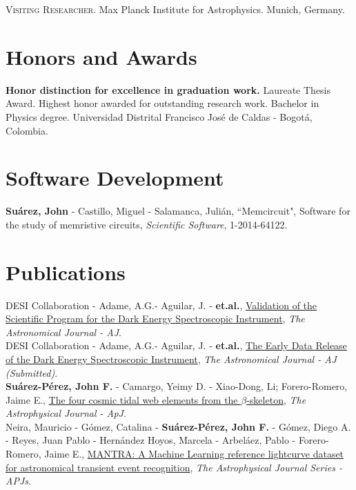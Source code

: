 \documentclass[10pt, a4paper]{article}
\newcommand{\years}[1]{\marginnote{\scriptsize #1}}
\begin{document}
\years{2019.06}\textsc{Visiting Researcher}. Max Planck Institute for Astrophysics. Munich, Germany.

\section*{Honors and Awards}
\years{2014}\textbf{Honor distinction for excellence in graduation work.} Laureate Thesis Award. 
Highest honor awarded for outstanding research work. Bachelor in Physics degree. Universidad Distrital Francisco José de Caldas - Bogotá, Colombia.

\section*{Software Development}
\noindent
\years{2014}\textbf{Suárez, John} - Castillo, Miguel - Salamanca, Julián, “Memcircuit", Software for 
the study of memristive circuits, \emph{Scientific Software}, 1-2014-64122.



\section*{Publications}

\noindent
\years{2024}DESI Collaboration - Adame, A.G.- Aguilar, J. - \textbf{et.al.}, \href{https://iopscience.iop.org/article/10.3847/1538-3881/ad0b08/pdf}{Validation of the 
Scientific Program for the Dark Energy Spectroscopic Instrument}, \emph{The Astronomical Journal - AJ}.
\\

\years{2023}DESI Collaboration - Adame, A.G.- Aguilar, J. - \textbf{et.al.}, \href{https://arxiv.org/abs/2306.06308}{The Early Data Release of the Dark Energy Spectroscopic Instrument}, \emph{The Astronomical Journal - AJ (Submitted)}.
\\

\years{2021}\textbf{Suárez-Pérez, John F.} - Camargo, Yeimy D. - Xiao-Dong, Li; Forero-Romero, 
Jaime E., \href{https://iopscience.iop.org/article/10.3847/1538-4357/ac1fed/pdf}{The four cosmic tidal web elements from the $\beta$-skeleton}, \emph{The Astrophysical Journal - ApJ}. 
\\

\years{2020}Neira, Mauricio - Gómez, Catalina - \textbf{Suárez-Pérez, John F.} - Gómez, Diego A. - Reyes, Juan Pablo - Hernández Hoyos, Marcela - Arbeláez, Pablo - Forero-Romero, Jaime E., \href{https://iopscience.iop.org/article/10.3847/1538-4365/aba267/pdf}{MANTRA: A Machine Learning reference lightcurve dataset for astronomical transient event recognition}, \emph{The Astrophysical Journal Series - APJs}.
\\
\end{document}
